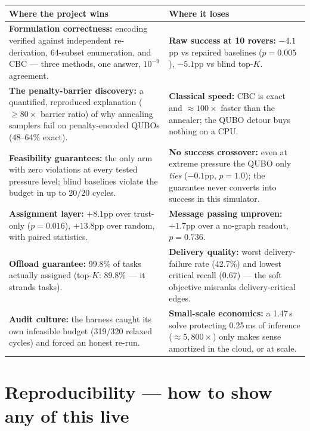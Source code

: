 \documentclass[11pt]{article}
\newcommand{\good}[1]{\textcolor{goodg}{\textbf{#1}}}
\newcommand{\bad}[1]{\textcolor{badr}{\textbf{#1}}}
\begin{document}
\begin{center}
\begin{tabular}{p{7.6cm}p{7.6cm}}
\textbf{\good{Where the project wins}} & \textbf{\bad{Where it loses}} \\
\midrule
\good{Formulation correctness:} encoding verified against independent
re-derivation, 64-subset enumeration, and CBC --- three methods, one
answer, $10^{-9}$ agreement. &
\bad{Raw success at 10 rovers:} $-4.1$pp vs repaired baselines
($p{=}0.005$), $-5.1$pp vs blind top-$K$. \\
\good{The penalty-barrier discovery:} a quantified, reproduced explanation
($\ge 80\times$ barrier ratio) of why annealing samplers fail on
penalty-encoded QUBOs (48--64\% exact). &
\bad{Classical speed:} CBC is exact and $\approx 100\times$ faster than
the annealer; the QUBO detour buys nothing on a CPU. \\
\good{Feasibility guarantees:} the only arm with zero violations at every
tested pressure level; blind baselines violate the budget in up to 20/20
cycles. &
\bad{No success crossover:} even at extreme pressure the QUBO only
\emph{ties} ($-0.1$pp, $p{=}1.0$); the guarantee never converts into
success in this simulator. \\
\good{Assignment layer:} $+8.1$pp over trust-only ($p{=}0.016$), $+13.8$pp
over random, with paired statistics. &
\bad{Message passing unproven:} $+1.7$pp over a no-graph readout,
$p{=}0.736$. \\
\good{Offload guarantee:} 99.8\% of tasks actually assigned (top-$K$:
89.8\% --- it strands tasks). &
\bad{Delivery quality:} worst delivery-failure rate (42.7\%) and lowest
critical recall (0.67) --- the soft objective misranks delivery-critical
edges. \\
\good{Audit culture:} the harness caught its own infeasible budget
(319/320 relaxed cycles) and forced an honest re-run. &
\bad{Small-scale economics:} a 1.47\,s solve protecting 0.25\,ms of
inference ($\approx 5{,}800\times$) only makes sense amortized in the
cloud, or at scale. \\
\end{tabular}
\end{center}

\section{Reproducibility --- how to show any of this live}
\end{document}
